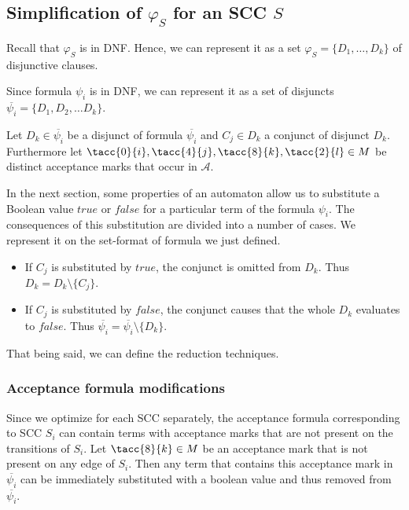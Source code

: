 \documentclass[a4paper,UKenglish,cleveref, autoref, thm-restate]{lipics-v2021}
\def\false{\mathit{false}}
\def\true{\mathit{true}}
\begin{document}
\subsection{Simplification of $\varphi_S$ for an SCC $S$}\label{ssec:step1}
Recall that $\varphi_S$ is in DNF. Hence, we can represent it as a set
$\varphi_S=\{D_1,\ldots,D_k\}$ of disjunctive clauses.





Since formula $\psi_{i}$ is in DNF, we can represent it as a set of disjuncts $\overline{\psi_{i}} = \{D_1, D_2, \ldots D_k\}$.

Let $D_{k} \in \overline{\psi_{i}}$ be a disjunct of formula $\overline{\psi_{i}}$ and $C_{j} \in D_{k}$ a conjunct of disjunct $D_{k}$. Furthermore let  $\tacc{0}{i}, \tacc{4}{j}, \tacc{8}{k}, \tacc{2}{l} \in M$ be distinct acceptance marks that occur in $\mathcal{A}$.

In the next section, some properties of an automaton allow us to substitute a Boolean value $\true$ or $\false$ for a particular term of the formula $\psi_i$.
The consequences of this substitution are divided into a number of cases. We represent it on the set-format of formula we just defined.

\begin{itemize}
    \item If $C_{j}$ is substituted by $\true$, the conjunct is omitted from $D_{k}$. Thus $D_{k} = D_{k} \setminus \{C_{j}\}$.
    \item If $C_{j}$ is substituted by $\false$, the conjunct causes that the whole $D_{k}$ evaluates to $\false$. Thus $\overline{\psi_{i}} = \overline{\psi_{i}} \setminus \{D_{k}\}$.

\end{itemize}

That being said, we can define the reduction techniques. 

\subsubsection{Acceptance formula modifications\\} 
\label{subsection:acc_modif}
Since we optimize for each SCC separately, the acceptance formula corresponding to SCC $S_{i}$ can contain terms with acceptance marks that are not present on the transitions of $S_{i}$.
Let $\tacc{8}{k} \in M$ be an acceptance mark that is not present on any edge of $S_{i}$. Then any term that contains this acceptance mark in $\overline{\psi_{i}}$ can be immediately substituted with a boolean value and thus removed from $\overline{\psi_{i}}$.
\medskip
\end{document}
